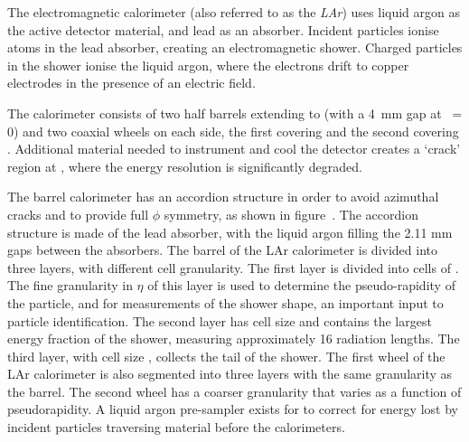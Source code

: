 The electromagnetic calorimeter (also referred to as the {\it LAr}) uses liquid
argon as the active detector material, and lead as an absorber. Incident
particles ionise atoms in the lead absorber, creating an electromagnetic shower.
Charged particles in the shower ionise the liquid argon, where the electrons
drift to copper electrodes in the presence of an electric field.

The calorimeter consists of two half barrels extending to  (with
a 4~mm gap at \z\ = 0) and two coaxial wheels on each side, the first covering
 and the second covering .
Additional material needed to instrument and cool the detector creates a `crack'
region at , where the energy resolution is
significantly degraded.

The barrel calorimeter has an accordion structure in order to avoid azimuthal
cracks and to provide full $\phi$ symmetry, as shown in
figure~. The accordion structure is made of
the lead absorber, with the liquid argon filling the 2.11 mm gaps between the
absorbers. The barrel of the LAr calorimeter is divided into three layers, with
different cell granularity. The first layer is divided into cells of 
. The fine granularity in $\eta$ of this layer
is used to determine the pseudo-rapidity of the particle, and for measurements
of the shower shape, an important input to particle identification. The
second layer has cell size  and contains the
largest energy fraction of the shower, measuring approximately 16 radiation 
lengths. The third layer, with cell size , collects
the tail of the shower. The first wheel of the LAr calorimeter is also segmented into
three layers with the same granularity as the barrel. The second wheel has a
coarser granularity that varies as a function of pseudorapidity. A liquid argon
pre-sampler exists for  to correct for energy lost by incident
particles traversing material before the calorimeters.


